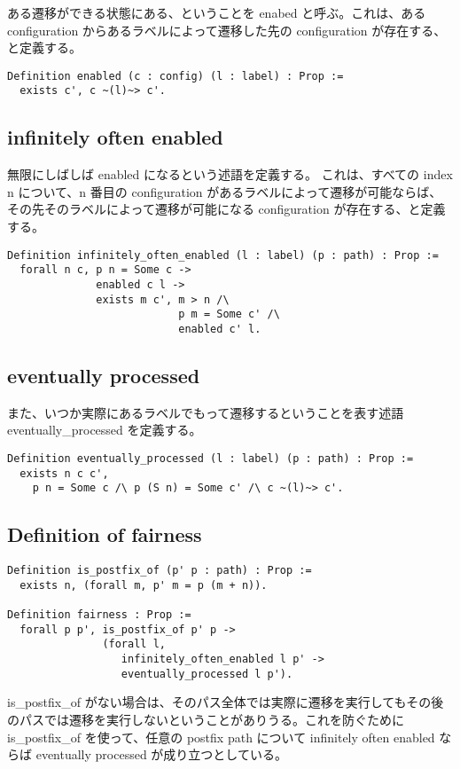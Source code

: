 ある遷移ができる状態にある、ということを enabed と呼ぶ。これは、ある configuration からあるラベルによって遷移した先の configuration が存在する、と定義する。

\begin{lstlisting}
Definition enabled (c : config) (l : label) : Prop :=
  exists c', c ~(l)~> c'.
\end{lstlisting}

\subsection{infinitely often enabled}
無限にしばしば enabled になるという述語を定義する。
これは、すべての index n について、n 番目の configuration があるラベルによって遷移が可能ならば、その先そのラベルによって遷移が可能になる configuration が存在する、と定義する。

\begin{lstlisting}
Definition infinitely_often_enabled (l : label) (p : path) : Prop :=
  forall n c, p n = Some c ->
              enabled c l ->
              exists m c', m > n /\
                           p m = Some c' /\
                           enabled c' l.
\end{lstlisting}


\subsection{eventually processed}
また、いつか実際にあるラベルでもって遷移するということを表す述語 eventually\_processed を定義する。

\begin{lstlisting}
Definition eventually_processed (l : label) (p : path) : Prop :=
  exists n c c',
    p n = Some c /\ p (S n) = Some c' /\ c ~(l)~> c'.
\end{lstlisting}


\subsection{Definition of fairness}

\begin{lstlisting}
Definition is_postfix_of (p' p : path) : Prop :=
  exists n, (forall m, p' m = p (m + n)).

Definition fairness : Prop :=
  forall p p', is_postfix_of p' p ->
               (forall l,
                  infinitely_often_enabled l p' ->
                  eventually_processed l p').
\end{lstlisting}


is\_postfix\_of がない場合は、そのパス全体では実際に遷移を実行してもその後のパスでは遷移を実行しないということがありうる。これを防ぐために is\_postfix\_of を使って、任意の postfix path について infinitely often enabled ならば eventually processed が成り立つとしている。
